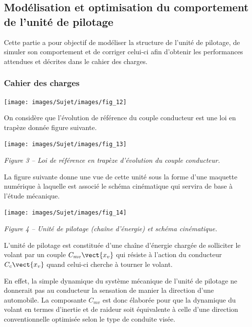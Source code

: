 \documentclass[10pt,fleqn]{article} %
\begin{document}
\subsection{Modélisation et optimisation du comportement de l'unité de pilotage}

\begin{obj}
Cette partie a pour objectif de modéliser la structure de l'unité de pilotage, de simuler son
comportement et de corriger celui-ci afin d'obtenir les performances attendues et décrites
dans le cahier des charges.
\end{obj}

\subsubsection*{Cahier des charges}

\begin{center}
\texttt{[image: images/Sujet/images/fig\_12]}

\end{center}

On considère que l'évolution de référence du couple conducteur est une loi en trapèze donnée
figure suivante.


\begin{center}
\texttt{[image: images/Sujet/images/fig\_13]}

\textit{Figure 3 -- Loi de référence en trapèze d'évolution du couple conducteur.}
\end{center}

La figure suivante donne une vue de cette unité sous la forme d'une maquette numérique à laquelle est
associé le schéma cinématique qui servira de base à l'étude mécanique.

\begin{center}
\texttt{[image: images/Sujet/images/fig\_14]}

\textit{Figure 4 -- Unité de pilotage (chaîne d'énergie) et schéma cinématique.}
\end{center}


L'unité de pilotage est constituée d'une chaîne d'énergie chargée de solliciter le volant par un
couple $C_{mv}\vect{x_v}$ qui résiste à l'action du conducteur $C_{c}\vect{x_v}$
quand celui-ci cherche à tourner le volant.

En effet, la simple dynamique du système mécanique de l'unité de pilotage ne donnerait pas au
conducteur la sensation de manier la direction d'une automobile. La composante $C_{mv}$ est donc élaborée
pour que la dynamique du volant en termes d'inertie et de raideur soit équivalente à celle d'une direction
conventionnelle optimisée selon le type de conduite visée.
\end{document}

